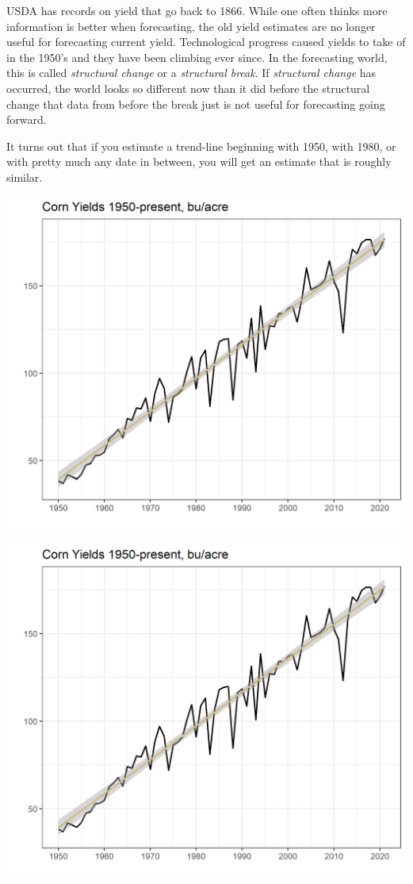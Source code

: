 \documentclass[
]{book}
\begin{document}
USDA has records on yield that go back to 1866. While one often thinks more information is better when forecasting, the old yield estimates are no longer useful for forecasting current yield. Technological progress caused yields to take of in the 1950's and they have been climbing ever since. In the forecasting world, this is called \emph{structural change} or a \emph{structural break}. If \emph{structural change} has occurred, the world looks so different now than it did before the structural change that data from before the break just is not useful for forecasting going forward.

It turns out that if you estimate a trend-line beginning with 1950, with 1980, or with pretty much any date in between, you will get an estimate that is roughly similar.

\includegraphics{assets/ForecastProduction-yields1950.png}

\includegraphics{assets/ForecastProduction-yields1950.png}
\end{document}
